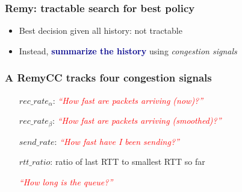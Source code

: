 \begin{frame}
\frametitle{Remy: tractable search for best policy}

\Large

\begin{centering}

\end{centering}

\ssline
\ssline
\ssline

\begin{itemize}

\item Best decision given all history: not tractable

\item Instead, \textbf{\textcolor{DarkBlue}{summarize the history}}
using \textit{congestion signals}

\end{itemize}

\end{frame}

\begin{frame}
\frametitle{A RemyCC tracks four congestion signals}

\large

\hspace{0.5 cm}\begin{minipage}{10.0 cm}
\begin{itemize}

\item[$rec\_rate_\alpha$:] \textcolor{Red}{\textit{``How fast are packets arriving (now)?''}}

\item[$rec\_rate_\beta$:] \textcolor{Red}{\textit{``How fast are packets arriving (smoothed)?''}}

\item[]

\item[$send\_rate$:] \textcolor{Red}{\textit{``How fast have I been sending?''}}

\item[]

\item[$rtt\_ratio$:] ratio of last RTT to smallest RTT so far

\textcolor{Red}{\textit{``How long is the queue?''}}

\end{itemize}
\end{minipage}

\end{frame}

